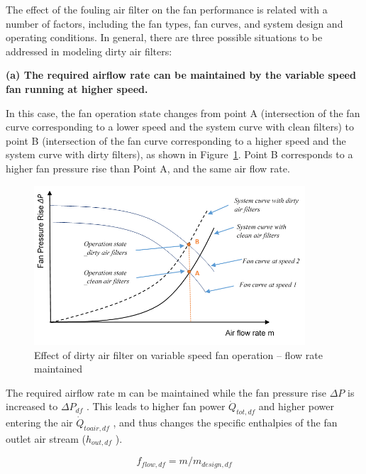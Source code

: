The effect of the fouling air filter on the fan performance is related with a number of factors, including the fan types, fan curves, and system design and operating conditions. In general, there are three possible situations to be addressed in modeling dirty air filters:

\textbf{(a) The required airflow rate can be maintained by the variable speed fan running at higher speed.}

In this case, the fan operation state changes from point A (intersection of the fan curve corresponding to a lower speed and the system curve with clean filters) to point B (intersection of the fan curve corresponding to a higher speed and the system curve with dirty filters), as shown in Figure~\ref{fig:effect-of-dirty-air-filter-on-variable-speed}. Point B corresponds to a higher fan pressure rise than Point A, and the same air flow rate.

\begin{figure}[hbtp] %
\centering
\includegraphics[width=0.9\textwidth, height=0.9\textheight, keepaspectratio=true]{media/image8006.png}
\caption{Effect of dirty air filter on variable speed fan operation – flow rate maintained \protect \label{fig:effect-of-dirty-air-filter-on-variable-speed}}
\end{figure}

The required airflow rate m can be maintained while the fan pressure rise \(\Delta P\) is increased to \(\Delta P_{df}\) . This leads to higher fan power \(\dot Q_{tot,df}\) and higher power entering the air \(\dot Q_{toair,df}\) , and thus changes the specific enthalpies of the fan outlet air stream (\(h_{out,df}\) ).

\begin{equation}
f_{flow,df} = m / m_{design,df}
\end{equation}

